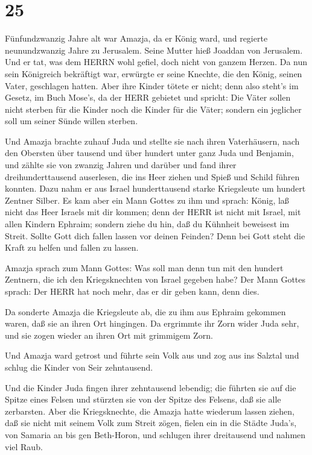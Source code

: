 \hypertarget{section-24}{%
\section{25}\label{section-24}}

 Fünfundzwanzig Jahre alt war Amazja, da er König ward, und
regierte neunundzwanzig Jahre zu Jerusalem. Seine Mutter hieß Joaddan
von Jerusalem.  Und er tat, was dem HERRN wohl gefiel, doch
nicht von ganzem Herzen.  Da nun sein Königreich bekräftigt
war, erwürgte er seine Knechte, die den König, seinen Vater, geschlagen
hatten.  Aber ihre Kinder tötete er nicht; denn also steht's
im Gesetz, im Buch Mose's, da der HERR gebietet und spricht: Die Väter
sollen nicht sterben für die Kinder noch die Kinder für die Väter;
sondern ein jeglicher soll um seiner Sünde willen sterben.

 Und Amazja brachte zuhauf Juda und stellte sie nach ihren
Vaterhäusern, nach den Obersten über tausend und über hundert unter ganz
Juda und Benjamin, und zählte sie von zwanzig Jahren und darüber und
fand ihrer dreihunderttausend auserlesen, die ins Heer ziehen und Spieß
und Schild führen konnten.  Dazu nahm er aus Israel
hunderttausend starke Kriegsleute um hundert Zentner Silber.
 Es kam aber ein Mann Gottes zu ihm und sprach: König, laß
nicht das Heer Israels mit dir kommen; denn der HERR ist nicht mit
Israel, mit allen Kindern Ephraim;  sondern ziehe du hin,
daß du Kühnheit beweisest im Streit. Sollte Gott dich fallen lassen vor
deinen Feinden? Denn bei Gott steht die Kraft zu helfen und fallen zu
lassen.

 Amazja sprach zum Mann Gottes: Was soll man denn tun mit
den hundert Zentnern, die ich den Kriegsknechten von Israel gegeben
habe? Der Mann Gottes sprach: Der HERR hat noch mehr, das er dir geben
kann, denn dies.

 Da sonderte Amazja die Kriegsleute ab, die zu ihm aus
Ephraim gekommen waren, daß sie an ihren Ort hingingen. Da ergrimmte ihr
Zorn wider Juda sehr, und sie zogen wieder an ihren Ort mit grimmigem
Zorn.

 Und Amazja ward getrost und führte sein Volk aus und zog
aus ins Salztal und schlug die Kinder von Seir zehntausend.

 Und die Kinder Juda fingen ihrer zehntausend lebendig; die
führten sie auf die Spitze eines Felsen und stürzten sie von der Spitze
des Felsens, daß sie alle zerbarsten.  Aber die
Kriegsknechte, die Amazja hatte wiederum lassen ziehen, daß sie nicht
mit seinem Volk zum Streit zögen, fielen ein in die Städte Juda's, von
Samaria an bis gen Beth-Horon, und schlugen ihrer dreitausend und nahmen
viel Raub.

